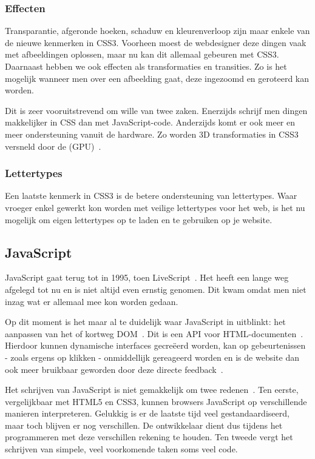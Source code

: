 \subsubsection{Effecten}
Transparantie, afgeronde hoeken, schaduw en kleurenverloop zijn maar enkele van de nieuwe kenmerken in CSS3. 
Voorheen moest de webdesigner deze dingen vaak met afbeeldingen oplossen, maar nu kan dit allemaal gebeuren met CSS3. 
Daarnaast hebben we ook effecten als transformaties en transities. 
Zo is het mogelijk wanneer men over een afbeelding gaat, deze ingezoomd en geroteerd kan worden. 

Dit is zeer vooruitstrevend om wille van twee zaken. 
Enerzijds schrijf men dingen makkelijker in CSS dan met JavaScript-code. 
Anderzijds komt er ook meer en meer ondersteuning vanuit de hardware. 
Zo worden 3D transformaties in CSS3 versneld door de  (GPU)~\cite{Hales2012,Kool2012}.

\subsubsection{Lettertypes}
Een laatste kenmerk in CSS3 is de betere ondersteuning van lettertypes. 
Waar vroeger enkel gewerkt kon worden met veilige lettertypes voor het web, is het nu mogelijk om eigen lettertypes op te laden en te gebruiken op je website.

\subsection{JavaScript}
\label{ref:javascript}
JavaScript gaat terug tot in 1995, toen LiveScript~\cite{McFarland2011}. 
Het heeft een lange weg afgelegd tot nu en is niet altijd even ernstig genomen. 
Dit kwam omdat men niet inzag wat er allemaal mee kon worden gedaan. 

Op dit moment is het maar al te duidelijk waar JavaScript in uitblinkt: het aanpassen van het  of kortweg DOM~\cite{PhilDutson2012}. 
Dit is een API voor HTML-documenten~\cite{Hegaret2004}. 
Hierdoor kunnen dynamische interfaces gecreëerd worden, kan op gebeurtenissen - zoals ergens op klikken - onmiddellijk gereageerd worden en is de website dan ook meer bruikbaar geworden door deze directe feedback~\cite{McFarland2011}.

Het schrijven van JavaScript is niet gemakkelijk om twee redenen~\cite{McFarland2011}. 
Ten eerste, vergelijkbaar met HTML5 en CSS3, kunnen browsers JavaScript op verschillende manieren interpreteren. 
Gelukkig is er de laatste tijd veel gestandaardiseerd, maar toch blijven er nog verschillen. %
De ontwikkelaar dient dus tijdens het programmeren met deze verschillen rekening te houden. 
Ten tweede vergt het schrijven van simpele, veel voorkomende taken soms veel code.

